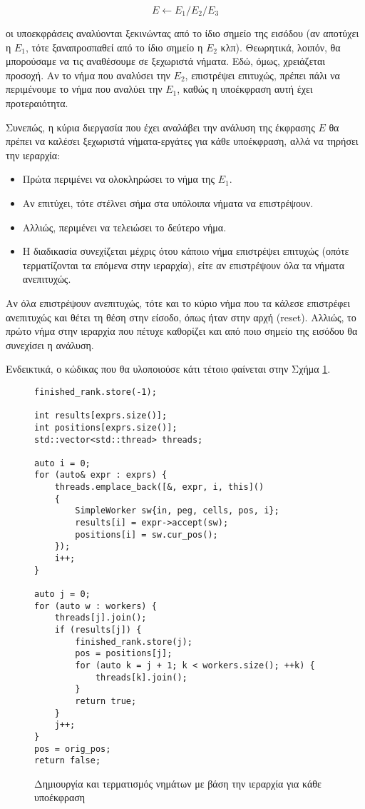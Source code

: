 \begin{equation}
	E \leftarrow E_1 / E_2 /  E_3
\end{equation}

οι υποεκφράσεις αναλύονται ξεκινώντας από το ίδιο σημείο της εισόδου (αν αποτύχει η $E_1$, τότε ξαναπροσπαθεί από το ίδιο σημείο η $E_2$ κλπ).
Θεωρητικά, λοιπόν, θα μπορούσαμε να τις αναθέσουμε σε ξεχωριστά νήματα.
Εδώ, όμως, χρειάζεται προσοχή.
Αν το νήμα που αναλύσει την $E_2$, επιστρέψει επιτυχώς, πρέπει πάλι να περιμένουμε το νήμα που αναλύει την $E_1$, καθώς η υποέκφραση αυτή έχει προτεραιότητα.

Συνεπώς, η κύρια διεργασία που έχει αναλάβει την ανάλυση της έκφρασης $E$ θα πρέπει να καλέσει ξεχωριστά νήματα-εργάτες για κάθε υποέκφραση, αλλά να τηρήσει την ιεραρχία:

\begin{itemize}
	\item Πρώτα περιμένει να ολοκληρώσει το νήμα της $E_1$.
	\item Αν επιτύχει, τότε στέλνει σήμα στα υπόλοιπα νήματα να επιστρέψουν.
	\item Αλλιώς, περιμένει να τελειώσει το δεύτερο νήμα.
	\item Η διαδικασία συνεχίζεται μέχρις ότου κάποιο νήμα επιστρέψει επιτυχώς (οπότε τερματίζονται τα 
	  επόμενα στην ιεραρχία), είτε αν επιστρέψουν όλα τα νήματα ανεπιτυχώς. %
\end{itemize}

Αν όλα επιστρέψουν ανεπιτυχώς, τότε και το κύριο νήμα που τα κάλεσε επιστρέφει ανεπιτυχώς και θέτει τη θέση στην είσοδο, όπως ήταν στην αρχή (reset).
Αλλιώς, το πρώτο νήμα στην ιεραρχία που πέτυχε καθορίζει και από ποιο σημείο της εισόδου θα συνεχίσει η ανάλυση.

Ενδεικτικά, ο κώδικας που θα υλοποιούσε κάτι τέτοιο φαίνεται στην Σχήμα \ref{fig:top_down_1}.

\begin{figure}[h]
\setlength\partopsep{-\topsep}%
\begin{verbatim}
finished_rank.store(-1);

int results[exprs.size()];
int positions[exprs.size()];
std::vector<std::thread> threads;

auto i = 0;
for (auto& expr : exprs) { 
    threads.emplace_back([&, expr, i, this]()
    {
        SimpleWorker sw{in, peg, cells, pos, i};
        results[i] = expr->accept(sw);
        positions[i] = sw.cur_pos();
    });
    i++;
}

auto j = 0;
for (auto w : workers) {
    threads[j].join(); 
    if (results[j]) { 
        finished_rank.store(j);
        pos = positions[j];
        for (auto k = j + 1; k < workers.size(); ++k) {
            threads[k].join();
        }
        return true;
    }
    j++;
}
pos = orig_pos;
return false;
\end{verbatim}
\caption{Δημιουργία και τερματισμός νημάτων με βάση την ιεραρχία για κάθε υποέκφραση}
\label{fig:top_down_1}
\end{figure}

